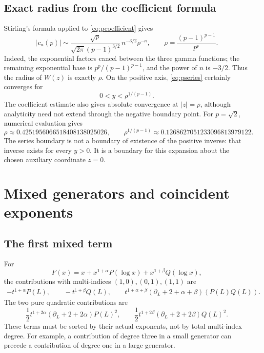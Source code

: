 \documentclass[11pt,a4paper]{article}
\newcommand{\dd}{\partial_L}
\theoremstyle{definition}
\begin{document}
\subsection{Exact radius from the coefficient formula}
Stirling's formula applied to \eqref{eq:pcoefficient} gives
\begin{equation}\label{eq:pasympt}
 |c_n(p)|\sim
 \frac{\sqrt p}{\sqrt{2\pi}(p-1)^{3/2}}\,
 n^{-3/2}\rho^{-n},
 \qquad
 \rho=\frac{(p-1)^{p-1}}{p^p}.
\end{equation}
Indeed, the exponential factors cancel between the three gamma functions;
the remaining exponential base is \(p^p/(p-1)^{p-1}\), and the power of \(n\)
is \(-3/2\). Thus the radius of \(W(z)\) is exactly \(\rho\). On the positive
axis, \eqref{eq:pseries} certainly converges for
\begin{equation}\label{eq:pthreshold}
 0<y<\rho^{1/(p-1)}.
\end{equation}
The coefficient estimate also gives absolute convergence at \(|z|=\rho\),
although analyticity need not extend through the negative boundary point.
For \(p=\sqrt2\), numerical evaluation gives
\[
 \rho\approx0.4251956066518408138025026,\qquad
 \rho^{1/(p-1)}\approx0.1268627051233096813979122.
\]
The series boundary is not a boundary of existence of the positive inverse:
that inverse exists for every \(y>0\). It is a boundary for this expansion
about the chosen auxiliary coordinate \(z=0\).

\section{Mixed generators and coincident exponents}
\subsection{The first mixed term}
For
\[
 F(x)=x+x^{1+\alpha}P(\log x)+x^{1+\beta}Q(\log x),
\]
the contributions with multi-indices \((1,0),(0,1),(1,1)\) are
\begin{align*}
 -t^{1+\alpha}P(L),\qquad
 -t^{1+\beta}Q(L),\qquad
 t^{1+\alpha+\beta}(\dd+2+\alpha+\beta)(P(L)Q(L)).
\end{align*}
The two pure quadratic contributions are
\[
 \frac12t^{1+2\alpha}(\dd+2+2\alpha)P(L)^2,
 \qquad
 \frac12t^{1+2\beta}(\dd+2+2\beta)Q(L)^2.
\]
These terms must be sorted by their actual exponents, not by total
multi-index degree. For example, a contribution of degree three in a small
generator can precede a contribution of degree one in a large generator.
\end{document}
